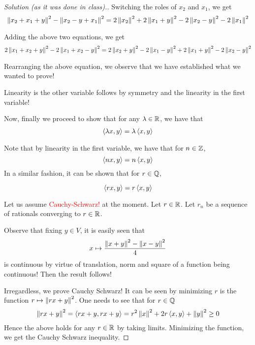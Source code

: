 \begin{proof}[Solution (as it was done in class).]
Switching the roles of $x_{2}$ and $x_{1}$, we get
\begin{align*}
    \left\lVert x_{2} + x_{1} + y \right\rVert^{2} - \left\lVert x_{2} - y + x_{1} \right\rVert ^{2} = 2\left\lVert x_{2} \right\rVert^{2} + 2 \left\lVert x_{1} + y \right\rVert ^{2} - 2 \left\lVert x_{2} - y \right\rVert^{2} - 2 \left\lVert x_{1} \right\rVert^{2}
\end{align*}

Adding the above two equations, we get
\begin{align*}
    2\left\lVert x_{1} + x_{2} + y \right\rVert^{2} - 2\left\lVert x_{1} +x_{2} -y  \right\rVert^{2} = 2 \left\lVert x_{2} + y \right\rVert^{2} - 2 \left\lVert x_{1} -y \right\rVert^{2} + 2 \left\lVert x_{1} + y \right\rVert ^{2} -2 \left\lVert x_{2}-y \right\rVert^{2}
\end{align*}

Rearranging the above equation, we observe that we have established what we wanted to prove!

Linearity is the other variable follows by symmetry and the linearity in the first variable!

Now, finally we proceed to show that for any $\lambda \in \mathbb R$, we have that 
\begin{align*}
    \left\langle \lambda x, y \right\rangle = \lambda \left\langle x,y \right\rangle
\end{align*}

Note that by linearity in the first variable, we have that for $n\in \mathbb Z$,
\begin{equation*}
    \left\langle nx,y \right\rangle = n \left\langle x,y \right\rangle
\end{equation*}
In a similar fashion, it can be shown that for $r\in \mathbb Q$,

\begin{equation*}
    \left\langle rx,y \right\rangle = r \left\langle x,y \right\rangle
\end{equation*}

Let us assume \textcolor{red}{Cauchy-Schwarz!} at the moment. Let $r\in \mathbb R$. Let $r_{n}$ be a sequence of rationals converging to $r\in \mathbb R$.

Observe that fixing $y\in V$, it is easily seen that 
\begin{equation*}
    x \mapsto \frac{\left\lVert x+y \right\rVert^{2} - \left\lVert x-y \right\rVert^{2}}{4}
\end{equation*}
is continuous by virtue of translation, norm and square of a function being continuous!
Then the result follows!

Irregardless, we prove Cauchy Schwarz! It can be seen by minimizing $r$ is the function $r \mapsto \left\lVert rx + y \right\rVert^{2}$. One needs to see that for $r\in \mathbb Q$
\begin{align*}
    \left\lVert rx+y \right\rVert^{2} = \left\langle rx+y , rx +y \right\rangle
    = r^{2} \left\lVert x \right\rVert^{2} + 2r\left\langle x,y \right\rangle + \left\lVert y \right\rVert^{2} \ge 0
\end{align*}
Hence the above holds for any $r\in \mathbb R$ by taking limits. Minimizing the function, we get the Cauchy Schwarz inequality.



\end{proof}
